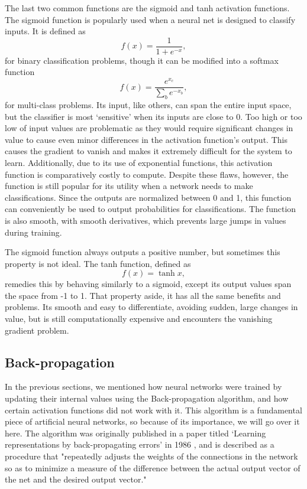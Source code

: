 \documentclass[11pt,a4paper,oldfontcommands]{memoir}
\begin{document}
The last two common functions are the sigmoid and tanh activation functions. The sigmoid function is popularly used when a neural net is designed to classify inputs. It is defined as
\begin{equation}
    f(x) = \frac{1}{1 + e^{-x}},
\end{equation}
for binary classification problems, though it can be modified into a softmax function
\begin{equation}
    f(x) = \frac{e^{x_c}}{\sum_b e^{-x_b}},
\end{equation}
for multi-class problems. Its input, like others, can span the entire input space, but the classifier is most `sensitive' when its inputs are close to 0. Too high or too low of input values are problematic as they would require significant changes in value to cause even minor differences in the activation function's output. This causes the gradient to vanish and makes it extremely difficult for the system to learn. Additionally, due to its use of exponential functions, this activation function is comparatively costly to compute. Despite these flaws, however, the function is still popular for its utility when a network needs to make classifications. Since the outputs are normalized between 0 and 1, this function can conveniently be used to output probabilities for classifications. The function is also smooth, with smooth derivatives, which prevents large jumps in values during training. 

The sigmoid function always outputs a positive number, but sometimes this property is not ideal. The tanh function, defined as
\begin{equation}
    f(x) = \tanh{x}, 
\end{equation}
remedies this by behaving similarly to a sigmoid, except its output values span the space from -1 to 1. That property aside, it has all the same benefits and problems. Its smooth and easy to differentiate, avoiding sudden, large changes in value, but is still computationally expensive and encounters the vanishing gradient problem. 

\subsection{Back-propagation}
\label{ss:backprop}
In the previous sections, we mentioned how neural networks were trained by updating their internal values using the Back-propagation algorithm, and how certain activation functions did not work with it. This algorithm is a fundamental piece of artificial neural networks, so because of its importance, we will go over it here. The algorithm was originally published in a paper titled `Learning representations by back-propagating errors' in 1986 \cite{backprop}, and is described as a procedure that "repeatedly adjusts the weights of the connections in the network so as to minimize a measure of the difference between the actual output vector of the net and the desired output vector." \cite{backprop} 
\end{document}
